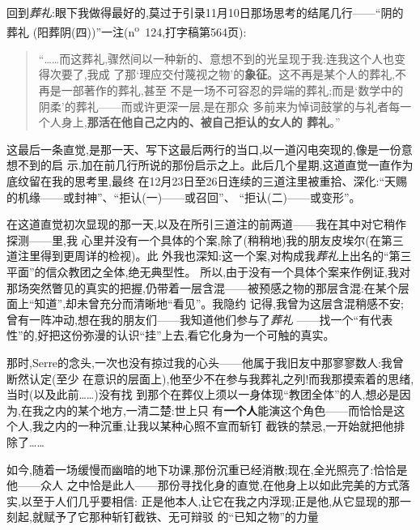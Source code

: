 回到\emph{葬礼}:眼下我做得最好的,莫过于引录11月10日那场思考的结尾几行——“阴的葬礼
(阳葬阴(四))”一注(n\textsuperscript{o}~124,打字稿第564页):
\begin{quote}
“……而这葬礼,骤然间以一种新的、意想不到的光呈现于我:连我这个人也变得次要了,我成
了那‘理应交付蔑视之物’的\textbf{象征}。这不再是某个人的葬礼,不再是一部著作的葬礼,甚至
不是一场不可容忍的异端的葬礼;而是‘数学中的阴柔’的葬礼——而或许更深一层,是在那众
多前来为悼词鼓掌的与礼者每一个人身上,\textbf{那活在他自己之内的、被自己拒认的女人的
葬礼}。”
\end{quote}
这最后一条直觉,是那一天、写下这最后两行的当口,以一道闪电突现的,像是一份意想不到的启
示,加在前几行所说的那份启示之上。此后几个星期,这道直觉一直作为底纹留在我的思考里,最终
在12月23日至26日连续的三道注里被重拾、深化:“天赐的机缘——或封神”、“拒认(一)——或召回”、
“拒认(二)——或变形”。

在这道直觉初次显现的那一天,以及在所引三道注的前两道——我在其中对它稍作探测——里,我
心里并没有一个具体的个案,除了(稍稍地)我的朋友皮埃尔(在第三道注里得到更周详的检视)。此
外我也深知:这一个案,对构成我\emph{葬礼}上出名的“第三平面”的信众教团之全体,绝无典型性。
所以,由于没有一个具体个案来作例证,我对那场突然瞥见的真实的把握,仍带着\dmark{}一层含混——被预感之物的那层含混:在某个层面上“知道”,却未曾充分而清晰地“看见”。我隐约
记得,我曾为这层含混稍感不安;曾有一阵冲动,想在我的朋友们——我知道他们参与了\emph{葬礼}
——找一个“有代表性”的,好把这份弥漫的认识“挂”上去,看它化身为一个可触的真实。

那时,Serre的念头,一次也没有掠过我的心头——他属于我旧友中那寥寥数人:我曾断然认定(至少
在意识的层面上),他至少不在参与我葬礼之列!而我那摸索着的思绪,当时(以及此前……)没有找
到那个在葬仪上须以一身体现“教团全体”的人,想必是因为,在我之内的某个地方,一清二楚:世上只
有\textbf{一个人}能演这个角色——而恰恰是这个人,我之内的一种沉重,让我以某种心照不宣而斩钉
截铁的禁忌,一开始就把他排除了……

如今,随着一场缓慢而幽暗的地下功课,那份沉重已经消散;现在,全光照亮了:恰恰是他——众人
之中恰是此人——那份寻找化身的直觉,在他身上以如此完美的方式落实,以至于人们几乎要相信:
正是他本人,让它在我之内浮现;正是他,从它显现的那一刻起,就赋予了它那种斩钉截铁、无可辩驳
的“已知之物”的力量



